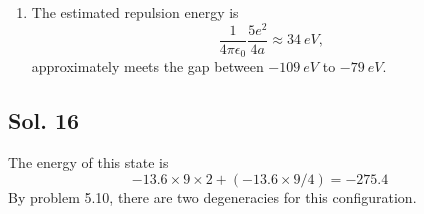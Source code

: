 \begin{enumerate}
\begin{align*}
        =&4\pi\frac{1}{r_1} 
        e^{-4r_2/a}(\frac{r_2^2}{-4/a}-\frac{2r_2}{16/a^2}+\frac{2}{-64/a^3})\bigg|^{r_1}_{0}\\
        =&
        4\pi\frac{1}{r_1} 
        \left[e^{-4r_1/a}(\frac{r_1^2}{-4/a}-\frac{2r_1}{16/a^2}+\frac{2}{-64/a^3})
        -\frac{2}{-64/a^3}
        \right]\\
        =&\pi(e^{-4r_1/a}(-r_1a-\frac{1}{2}a^2-\frac{a^3}{8r_1})+\frac{a^3}{8r_1})
       \end{align*}
       \begin{align*}
           &\frac{64}{\pi^2 a^6}
           \int\left[
           \pi e^{-4r_1/a}(ar_1+\frac{1}{4}a^2)
           +
           \pi(e^{-4r_1/a}(-r_1a-\frac{1}{2}a^2-\frac{a^3}{8r_1})+\frac{a^3}{8r_1})
           \right]e^{-4r_1/a}r_1^2\sin\theta_1 dr_1d\theta_1d\phi_1\\
           =&
           \frac{64}{ a^6}4
           \int 
           \left[
           (e^{-4r_1/a}(-\frac{1}{4}a^2-\frac{a^3}{8r_1})+\frac{a^3}{8r_1})
           \right]e^{-4r_1/a}r_1^2 dr_1\\
           =&
           \frac{64}{ a^6}4
           \int 
           \left[
           -\frac{1}{4}e^{-8r_1/a}a^2r_1^2 
            -\frac{1}{8}e^{-8r_1/a}a^3r_1
            +\frac{1}{8}e^{-4r_1/a}a^3r_1
           \right] dr_1\\
           =&
           \frac{256}{a^6}
           \bigg[
           -\frac{1}{4}a^2
           e^{-8/ar_1}
           (\frac{r_1^2}{-8/a}-\frac{2r_1}{64/a^2}+\frac{2}{-512/a^3})
           \bigg|^\infty_0\\
           &-
           \frac{1}{8}
           a^3
           e^{-8/ar_1}(\frac{-8/ar_1-1}{64/a^2})
           \bigg|^\infty_0
           +\frac{1}{8}
           a^3e^{-4/ar_1}(\frac{-4/ar_1-1}{16/a^2})\bigg|^\infty_0
           \bigg]\\
           =&
           \frac{256}{a^6}
           \left[
           -a^2\frac{a^3}{1024}
           -a^3\frac{a^2}{512}
           +a^3\frac{a^2}{128}
           \right]=\frac{5}{4a}
       \end{align*}
       \item 
       The estimated repulsion energy is 
       $$
       \frac{1}{4\pi\epsilon_0}\frac{5e^2}{4a}\approx 
       \qty{34}{eV},
       $$
       approximately meets the gap between $-\qty{109}{eV}$ to $-\qty{79}{eV}.$
       
   \end{enumerate}

   \subsection*{Sol. 16}
   The energy of this state is 
   $$
   -13.6\times9\times 2 + (-13.6\times 9 / 4)
   = -275.4
   $$
   By problem 5.10, there are two degeneracies for this configuration.


